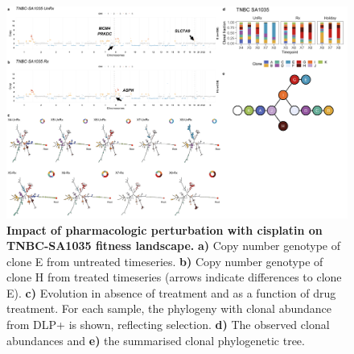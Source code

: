 \begin{figure}
\centering
\includegraphics[width=\textwidth]{Figures/chap4/genePlot1035.png}
\caption[Impact of pharmacologic perturbation with cisplatin on TNBC-SA1035 fitness landscape.]
	{\small
	\textbf{Impact of pharmacologic perturbation with cisplatin on TNBC-SA1035 fitness landscape.}
	    \textbf{a)} Copy number genotype of clone E from untreated timeseries. \textbf{b)} Copy number genotype of clone H from treated timeseries (arrows indicate differences to clone E). \textbf{c)}  Evolution in absence of treatment and as a function of drug treatment. For each sample, the phylogeny with clonal abundance from DLP+ is shown, reflecting selection. \textbf{d)} The observed clonal abundances and \textbf{e)} the summarised clonal phylogenetic tree.}
\label{sfig:genotype1035}
\end{figure}





